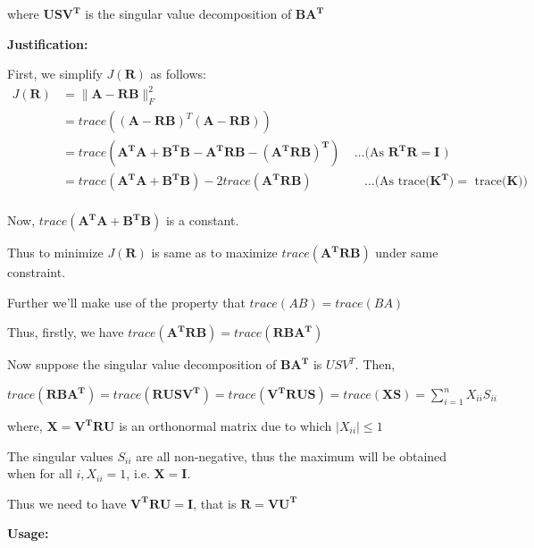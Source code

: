 \documentclass[fleqn, 11pt]{article}
\newcommand{\bs}[1]{\boldsymbol{#1}}
\begin{document}
where $\bs{USV^T}$ is the singular value decomposition of $\bs{BA^T}$

\hrulefill

\medskip

\textbf{Justification: }

\medskip


First, we simplify $J(\bs{R})$ as follows: 
\begin{align*}
    J(\boldsymbol{R}) &= \|\boldsymbol{A}-\boldsymbol{R} \boldsymbol{B}\|^2_F \\
    &= trace((\bs{A}-\bs{RB})^T (\bs{A}-\bs{RB}))  \\
    &= trace(\bs{A^TA + B^TB -  A^TRB - ( A^TRB  )^T  }) \;\;\;\; \ldots\text{(As $\bs{R^TR=I}$  )}\\
    &= trace(\bs{A^TA + B^TB}) - 2 trace(\bs{A^TRB}) \;\;\;\;\;\;\;\; \;\;\;\; \;\;\; 
    \ldots\text{(As trace($\bs{K^T})=$ trace($\bs{K}$))}\\
\end{align*}

Now, $trace(\bs{A^TA + B^TB})$ is a constant.

Thus to  minimize $J(\boldsymbol{R})$ is same as to maximize $trace(\bs{A^TRB})$ under same constraint. 

\medskip 

Further we'll make use of the property that $ trace(AB) = trace(BA) $ 

\smallskip

Thus, firstly, we have $trace(\bs{A^TRB}) = trace(\bs{RBA^T})$

\medskip 

Now suppose the singular value decomposition of $\bs{BA^T}$ is $USV^T$. Then, 
\begin{center}
    $trace(\bs{RBA^T})  =  trace(\bs{RUSV^T}) =  trace(\bs{V^TRUS}) =  trace(\bs{XS}) 
    = \displaystyle \sum_{i=1}^n X_{ii} S_{ii}   $
\end{center}
where, $\bs{X=V^TRU}$ is an orthonormal matrix due to which $|X_{ii}| \leq 1$ 

The singular values $S_{ii}$ are all non-negative, thus the maximum will be obtained when 
for all $i, X_{ii}=1$, i.e. $\bs{X=I}$. 

Thus we need to have $\bs{V^TRU=I}$, that is $\bs{R=VU^T}$


\hrulefill


\newpage 

\textbf{Usage: }

\medskip
\end{document}
